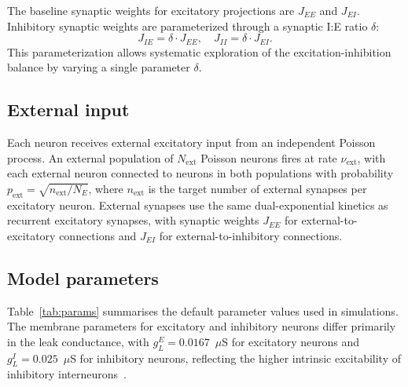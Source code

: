 \documentclass[%
	preprint, %
	amsmath,
	amssymb,
	aps,
	prx,
	floatfix,
	11pt %
]{revtex4-2}
\begin{document}
The baseline synaptic weights for excitatory projections are $J_{EE}$ and $J_{EI}$. Inhibitory synaptic weights are parameterized through a synaptic I:E ratio $\delta$:
\begin{equation}
    J_{IE} = \delta \cdot J_{EE}, \quad J_{II} = \delta \cdot J_{EI}.
\end{equation}
This parameterization allows systematic exploration of the excitation-inhibition balance by varying a single parameter $\delta$.

\subsection{External input}

Each neuron receives external excitatory input from an independent Poisson process. An external population of $N_{\mathrm{ext}}$ Poisson neurons fires at rate $\nu_{\mathrm{ext}}$, with each external neuron connected to neurons in both populations with probability $p_{\mathrm{ext}} = \sqrt{n_{\mathrm{ext}}/N_E}$, where $n_{\mathrm{ext}}$ is the target number of external synapses per excitatory neuron. External synapses use the same dual-exponential kinetics as recurrent excitatory synapses, with synaptic weights $J_{EE}$ for external-to-excitatory connections and $J_{EI}$ for external-to-inhibitory connections.

\subsection{Model parameters}

Table~\ref{tab:params} summarises the default parameter values used in simulations. The membrane parameters for excitatory and inhibitory neurons differ primarily in the leak conductance, with $g_L^E = 0.0167$~$\mu$S for excitatory neurons and $g_L^I = 0.025$~$\mu$S for inhibitory neurons, reflecting the higher intrinsic excitability of inhibitory interneurons~\cite{}.
\end{document}
